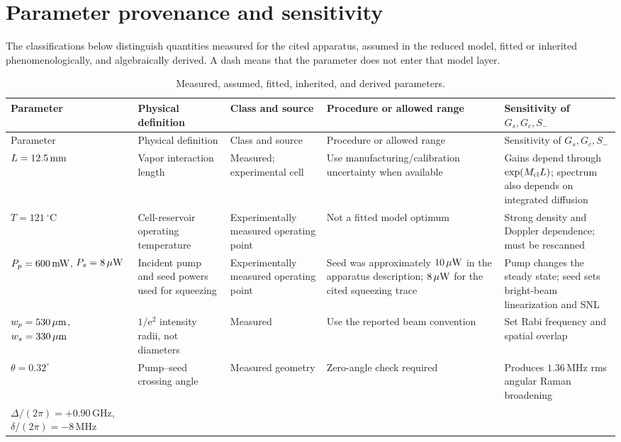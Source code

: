 \documentclass[11pt,a4paper]{article}
\newcommand{\e}{\mathrm e}
\newcommand{\GHz}{\,\mathrm{GHz}}
\newcommand{\MHz}{\,\mathrm{MHz}}
\newcommand{\degC}{\,^{\circ}\mathrm C}
\begin{document}
\section{Parameter provenance and sensitivity}
\label{app:parameters}

The classifications below distinguish quantities measured for the cited
apparatus, assumed in the reduced model, fitted or inherited
phenomenologically, and algebraically derived. A dash means that the
parameter does not enter that model layer.

\begingroup
\small
\setlength{\tabcolsep}{3pt}
\begin{longtable}{L{2.8cm}L{3.4cm}L{2.5cm}L{3.4cm}L{3.4cm}}
\caption{Measured, assumed, fitted, inherited, and derived parameters.}
\label{tab:parameter-provenance}\\
\toprule
Parameter & Physical definition & Class and source &
Procedure or allowed range & Sensitivity of $G_s,G_c,S_-$\\
\midrule
\endfirsthead
\toprule
Parameter & Physical definition & Class and source &
Procedure or allowed range & Sensitivity of $G_s,G_c,S_-$\\
\midrule
\endhead
$L=12.5\,{\rm mm}$ &
Vapor interaction length &
Measured; experimental cell \cite{Sim2025} &
Use manufacturing/calibration uncertainty when available &
Gains depend through $\exp(M_{\rm cl}L)$; spectrum also depends on integrated
diffusion\\
$T=121\degC$ &
Cell-reservoir operating temperature &
Experimentally measured operating point \cite{Sim2025} &
Not a fitted model optimum &
Strong density and Doppler dependence; must be rescanned\\
$P_p=600\,{\rm mW}$, $P_s=8\,\mu{\rm W}$ &
Incident pump and seed powers used for squeezing &
Experimentally measured operating point \cite{Sim2025} &
Seed was approximately $10\,\mu{\rm W}$ in the apparatus description;
$8\,\mu{\rm W}$ for the cited squeezing trace &
Pump changes the steady state; seed sets bright-beam linearization and SNL\\
$w_p=530\,\mu{\rm m}$, $w_s=330\,\mu{\rm m}$ &
$1/\e^2$ intensity radii, not diameters &
Measured \cite{Sim2025} &
Use the reported beam convention &
Set Rabi frequency and spatial overlap\\
$\theta=0.32^\circ$ &
Pump--seed crossing angle &
Measured geometry \cite{Sim2025} &
Zero-angle check required &
Produces $1.36\MHz$ rms angular Raman broadening\\
$\Delta/(2\pi)=+0.90\GHz$,
$\delta/(2\pi)=-8\MHz$ &

\end{longtable}
\end{document}
